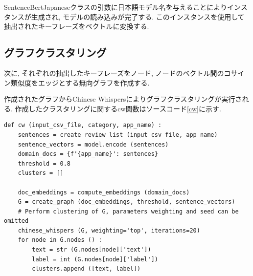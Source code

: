 

%

SentenceBertJapaneseクラスの引数に日本語モデル名を与えることによりインスタンスが生成され, モデルの読み込みが完了する. このインスタンスを使用して抽出されたキーフレーズをベクトルに変換する. 

\subsection{グラフクラスタリング}
次に, それぞれの抽出したキーフレーズをノード, ノードのベクトル間のコサイン類似度をエッジとする無向グラフを作成する. 

作成されたグラフからChinese Whispersによりグラフクラスタリングが実行される. 作成したクラスタリングに関するcw関数はソースコード\ref{cw}に示す. 

\begin{lstlisting}[caption=cw関数,label=cw]
  def cw (input_csv_file, category, app_name) :
    sentences = create_review_list (input_csv_file, app_name) 
    sentence_vectors = model.encode (sentences) 
    domain_docs = {f'{app_name}': sentences}
    threshold = 0.8
    clusters = []
    
    doc_embeddings = compute_embeddings (domain_docs) 
    G = create_graph (doc_embeddings, threshold, sentence_vectors) 
    # Perform clustering of G, parameters weighting and seed can be omitted
    chinese_whispers (G, weighting='top', iterations=20) 
    for node in G.nodes () :
        text = str (G.nodes[node]['text']) 
        label = int (G.nodes[node]['label']) 
        clusters.append ([text, label]) 
\end{lstlisting}

